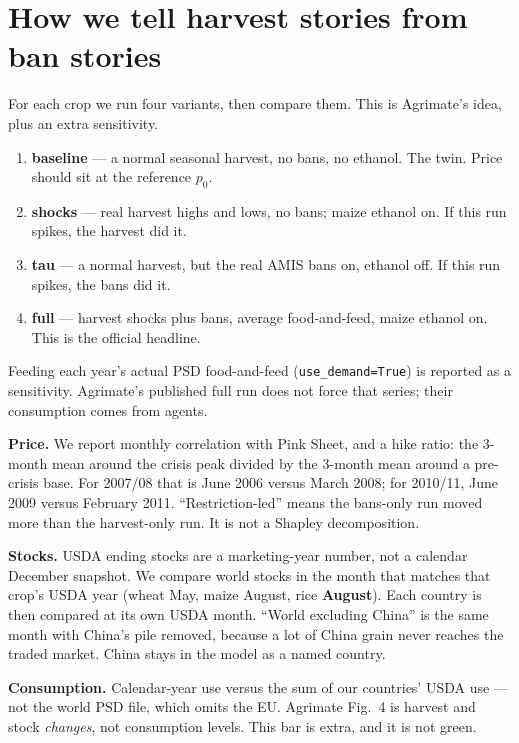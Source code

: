 \documentclass[11pt,a4paper]{article}
\begin{document}
\section{How we tell harvest stories from ban stories}
\label{sec:ident}

For each crop we run four variants, then compare them. This is Agrimate's
idea, plus an extra sensitivity.

\begin{enumerate}
\item \textbf{baseline} --- a normal seasonal harvest, no bans, no ethanol.
      The twin. Price should sit at the reference $p_0$.
\item \textbf{shocks} --- real harvest highs and lows, no bans; maize
      ethanol on. If this run spikes, the harvest did it.
\item \textbf{tau} --- a normal harvest, but the real AMIS bans on, ethanol
      off. If this run spikes, the bans did it.
\item \textbf{full} --- harvest shocks plus bans, average food-and-feed,
      maize ethanol on. This is the official headline.
\end{enumerate}

Feeding each year's actual PSD food-and-feed (\texttt{use\_demand=True}) is
reported as a sensitivity. Agrimate's published full run does not force
that series; their consumption comes from agents.

\textbf{Price.} We report monthly correlation with Pink Sheet, and a hike
ratio: the 3-month mean around the crisis peak divided by the 3-month mean
around a pre-crisis base. For 2007/08 that is June 2006 versus March 2008;
for 2010/11, June 2009 versus February 2011. ``Restriction-led'' means the
bans-only run moved more than the harvest-only run. It is not a Shapley
decomposition.

\textbf{Stocks.} USDA ending stocks are a marketing-year number, not a
calendar December snapshot. We compare world stocks in the month that
matches that crop's USDA year (wheat May, maize August, rice
\textbf{August}). Each country is then compared at its own USDA month.
``World excluding China'' is the same month with China's pile removed,
because a lot of China grain never reaches the traded market. China stays
in the model as a named country.

\textbf{Consumption.} Calendar-year use versus the sum of our countries'
USDA use --- not the world PSD file, which omits the EU. Agrimate Fig.~4
is harvest and stock \emph{changes}, not consumption levels. This bar is
extra, and it is not green.
\end{document}
